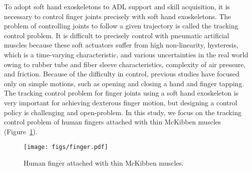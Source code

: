 \documentclass[letterpaper, 10 pt, conference]{ieeeconf}  %
\newcommand{\figref}{Figure~\ref}
\begin{document}
To adopt soft hand exoskeletons to ADL support and skill acquisition, it is necessary to control finger joints precisely with soft hand exoskeletons. The problem of controlling joints to follow a given trajectory is called the tracking control problem.
It is difficult to precisely control with pneumatic artificial muscles because these soft actuators suffer from high non-linearity, hysteresis, which is a time-varying characteristic, and various uncertainties in the real world owing to rubber tube and fiber sleeve characteristics, complexity of air pressure, and friction. Because of the difficulty in control, previous studies have focused only on simple motions, such as opening and closing a hand and finger tapping. The tracking control problem for finger joints using a soft hand exoskeleton is very important for achieving dexterous finger motion, but designing a control policy is challenging and open-problem. In this study, we focus on the tracking control problem of human fingers attached with thin McKibben muscles (\figref{fig:problem}).

\begin{figure}[t]
  \centering
  \texttt{[image: figs/finger.pdf]}
  \vspace{-5mm}
  \caption{Human finger attached with thin McKibben muscles.}
  \label{fig:problem}
  \vspace{-3mm}
\end{figure}
\end{document}
